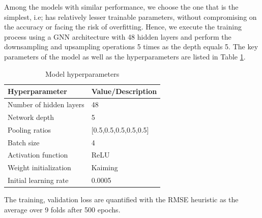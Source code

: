 Among the models with similar performance, we choose the one that is the simplest, i.e; has relatively lesser trainable parameters, without compromising on the accuracy or facing the risk of overfitting. Hence, we execute the training process using a GNN architecture with 48 hidden layers and perform the downsampling and upsampling operations 5 times as the depth equals 5. The key parameters of the model as well as the hyperparameters are listed in Table \ref{table:hp}. 
\begin{table}[ht]
    \centering
    \caption{Model hyperparameters}
    \label{table:hp}
    \begin{tabular}{|l|l|}
    \hline
    \textbf{Hyperparameter}    & \textbf{Value/Description} \\
    \hline
    Number of hidden layers    & 48                           \\
    \hline
    Network depth    & 5                          \\
    \hline
    Pooling ratios             & [0.5,0.5,0.5,0.5,0.5]                       \\
    \hline
    Batch size                 & 4                         \\
    \hline
    Activation function        & ReLU                       \\
    \hline
    Weight initialization    &  Kaiming                        \\
    \hline
    Initial learning rate       & 0.0005                       \\
    \hline
    \end{tabular}
    \end{table}
The training, validation loss are quantified with the \gls{RMSE} heuristic as the average over 9 folds after 500 epochs. 

